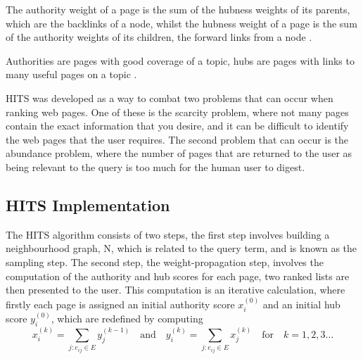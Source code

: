 \documentclass[11pt]{report}
\begin{document}
The authority weight of a page is the sum of the hubness weights of its parents, which are the backlinks of a node, whilst the hubness weight of a page is the sum of the authority weights of its children, the forward links from a node \cite{baldi2003modeling}.

{Authorities are pages with good coverage of a topic, hubs are pages with links to many useful pages on a topic \cite{bonato}.} 

HITS was developed as a way to combat two problems that can occur when ranking web pages. One of these is the scarcity problem, where not many pages contain the exact information that you desire, and it can be difficult to identify the web pages that the user requires. The second problem that can occur is the abundance problem, where the number of pages that are returned to the user as being relevant to the query is too much for the human user to digest. 



\subsection{HITS Implementation} \label{sec:HITS implementation}
The HITS algorithm consists of two steps, the first step involves building a neighbourhood graph, N, which is related to the query term, and is known as the sampling step. The second step, the weight-propagation step, involves the computation of the authority and hub scores for each page, two ranked lists are then presented to the user. This computation is an iterative calculation, where firstly each page is assigned an initial authority score $x_i^{(0)}$ and an initial hub score $y_i^{(0)}$, which are redefined by computing \begin{equation} \label{eq:HITS1}
x_i^{(k)} = \displaystyle \sum_{j:e_{ij}\in E} y_j^{(k-1)} \quad\mathrm{and}\quad y_i^{(k)} = \displaystyle \sum_{j:e_{ij}\in E} x_j^{(k)}  \quad\mathrm{for}\quad k=1,2,3\ldots
\end{equation} 
\end{document}
